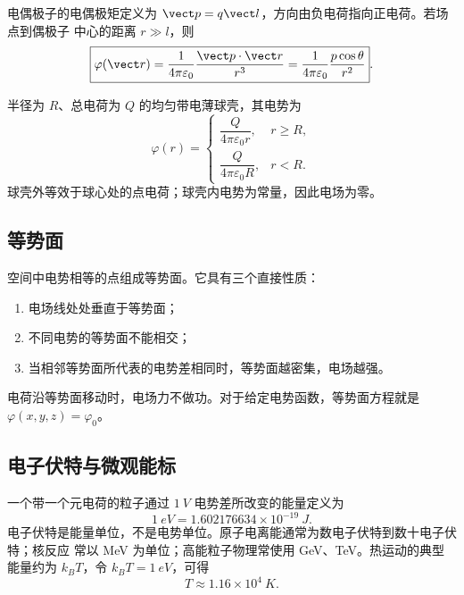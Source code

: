 电偶极子的电偶极矩定义为 $\vect p=q\vect l$，方向由负电荷指向正电荷。若场点到偶极子
中心的距离 $r\gg l$，则
\begin{equation}
  \boxed{\varphi(\vect r)=
  \frac{1}{4\pi\varepsilon_0}\frac{\vect p\cdot\vect r}{r^3}
  =\frac{1}{4\pi\varepsilon_0}\frac{p\cos\theta}{r^2}}.
\end{equation}

半径为 $R$、总电荷为 $Q$ 的均匀带电薄球壳，其电势为
\begin{equation}
  \boxed{\varphi(r)=
  \begin{cases}
    \dfrac{Q}{4\pi\varepsilon_0r}, & r\ge R,\\[6pt]
    \dfrac{Q}{4\pi\varepsilon_0R}, & r<R.
  \end{cases}}
\end{equation}
球壳外等效于球心处的点电荷；球壳内电势为常量，因此电场为零。

\subsection*{等势面}

空间中电势相等的点组成等势面。它具有三个直接性质：
\begin{enumerate}[label=\arabic*.,leftmargin=2em]
  \item 电场线处处垂直于等势面；
  \item 不同电势的等势面不能相交；
  \item 当相邻等势面所代表的电势差相同时，等势面越密集，电场越强。
\end{enumerate}
电荷沿等势面移动时，电场力不做功。对于给定电势函数，等势面方程就是
$\varphi(x,y,z)=\varphi_0$。

\dipoleEquipotentialDiagram

\subsection*{电子伏特与微观能标}

一个带一个元电荷的粒子通过 $\SI{1}{V}$ 电势差所改变的能量定义为
\begin{equation}
  \boxed{\SI{1}{eV}=1.602176634\times10^{-19}\ \si{J}}.
\end{equation}
电子伏特是能量单位，不是电势单位。原子电离能通常为数电子伏特到数十电子伏特；核反应
常以 \si{MeV} 为单位；高能粒子物理常使用 \si{GeV}、\si{TeV}。热运动的典型能量约为
$k_BT$，令 $k_BT=\SI{1}{eV}$，可得
\begin{equation}
  T\approx1.16\times10^4\ \si{K}.
\end{equation}

